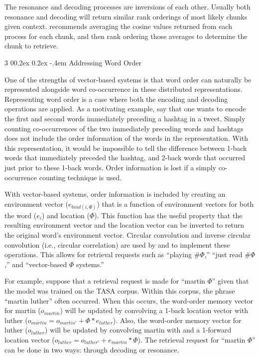 \documentclass[man,floatsintext,donotrepeattitle]{apa6}
\makeatletter
\renewcommand{\subsubsection}{%
  \@startsection
  {subsubsection}%
  {3}%
  {\parindent}%
  {0\baselineskip \@plus 0.2ex \@minus 0.2ex}%
  {-.4em}%
  {\normalfont\normalsize\bfseries\addperi}}
\makeatother
\begin{document}
The resonance and decoding processes are inversions of each other.
Usually both resonance and decoding will return similar rank orderings of most likely chunks given context.
\textcite{Jones2007} recommends averaging the cosine values returned from each process for each chunk, and then rank ordering those averages to determine the chunk to retrieve.

\subsubsection{Addressing Word Order}

One of the strengths of vector-based systems is that word order can naturally be represented alongside word co-occurrence in these distributed representations.
Representing word order is a case where both the encoding and decoding operations are applied.
As a motivating example, say that one wants to encode the first and second words immediately preceding a hashtag in a tweet.
Simply counting co-occurrences of the two immediately preceding words and hashtags does not include the order information of the words in the representation.
With this representation, it would be impossible to tell the difference between 1-back words that immediately preceded the hashtag, and 2-back words that occurred just prior to these 1-back words.
Order information is lost if a simply co-occurrence counting technique is used.

With vector-based systems, order information is included by creating an environment vector ($e_{bind(i,\Phi)}$) that is a function of environment vectors for both the word ($e_{i}$) and location ($\Phi$).
This function has the useful property that the resulting environment vector and the location vector can be inverted to return the original word's environment vector.
Circular convolution and inverse circular convolution (i.e., circular correlation) are used by \textcite{Plate1995} and \textcite{Jones2007} to implement these operations.
This allows for retrieval requests such as ``playing \#$\Phi$,'' ``just read \#$\Phi$,'' and ``vector-based $\Phi$ systems.''

For example, suppose that a retrieval request is made for ``martin $\Phi$'' given that the model was trained on the TASA corpus.
Within this corpus, the phrase ``martin luther'' often occurred.
When this occurs, the word-order memory vector for martin ($o_{martin}$) will be updated by convolving a 1-back location vector with luther ($o_{martin} = o_{martin'} + \Phi * e_{luther}$).
Also, the word-order memory vector for luther ($o_{luther}$) will be updated by convolving martin with and a 1-forward location vector ($o_{luther} = o_{luther'} + e_{martin} * \Phi$).
The retrieval request for ``martin $\Phi$'' can be done in two ways: through decoding or resonance.
\end{document}

